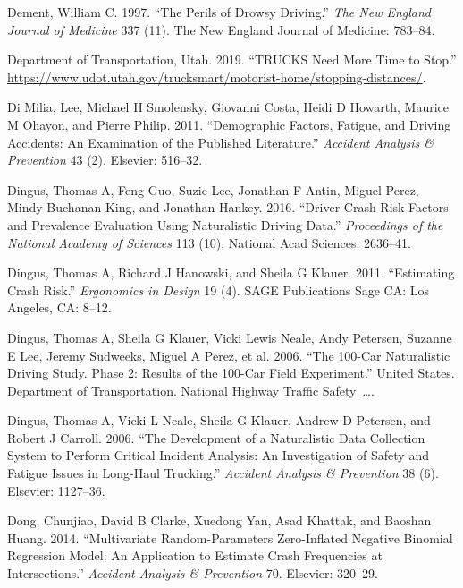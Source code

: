 \documentclass[12pt]{book}
\numberwithin{equation}{chapter}
\begin{document}
\leavevmode\hypertarget{ref-dement1997perils}{}%
Dement, William C. 1997. ``The Perils of Drowsy Driving.'' \emph{The New England Journal of Medicine} 337 (11). The New England Journal of Medicine: 783--84.

\leavevmode\hypertarget{ref-utah2019}{}%
Department of Transportation, Utah. 2019. ``TRUCKS Need More Time to Stop.'' \url{https://www.udot.utah.gov/trucksmart/motorist-home/stopping-distances/}.

\leavevmode\hypertarget{ref-di2011demographic}{}%
Di Milia, Lee, Michael H Smolensky, Giovanni Costa, Heidi D Howarth, Maurice M Ohayon, and Pierre Philip. 2011. ``Demographic Factors, Fatigue, and Driving Accidents: An Examination of the Published Literature.'' \emph{Accident Analysis \& Prevention} 43 (2). Elsevier: 516--32.

\leavevmode\hypertarget{ref-dingus2016driver}{}%
Dingus, Thomas A, Feng Guo, Suzie Lee, Jonathan F Antin, Miguel Perez, Mindy Buchanan-King, and Jonathan Hankey. 2016. ``Driver Crash Risk Factors and Prevalence Evaluation Using Naturalistic Driving Data.'' \emph{Proceedings of the National Academy of Sciences} 113 (10). National Acad Sciences: 2636--41.

\leavevmode\hypertarget{ref-dingus2011estimating}{}%
Dingus, Thomas A, Richard J Hanowski, and Sheila G Klauer. 2011. ``Estimating Crash Risk.'' \emph{Ergonomics in Design} 19 (4). SAGE Publications Sage CA: Los Angeles, CA: 8--12.

\leavevmode\hypertarget{ref-dingus2006100}{}%
Dingus, Thomas A, Sheila G Klauer, Vicki Lewis Neale, Andy Petersen, Suzanne E Lee, Jeremy Sudweeks, Miguel A Perez, et al. 2006. ``The 100-Car Naturalistic Driving Study. Phase 2: Results of the 100-Car Field Experiment.'' United States. Department of Transportation. National Highway Traffic Safety~\ldots{}.

\leavevmode\hypertarget{ref-dingus2006development}{}%
Dingus, Thomas A, Vicki L Neale, Sheila G Klauer, Andrew D Petersen, and Robert J Carroll. 2006. ``The Development of a Naturalistic Data Collection System to Perform Critical Incident Analysis: An Investigation of Safety and Fatigue Issues in Long-Haul Trucking.'' \emph{Accident Analysis \& Prevention} 38 (6). Elsevier: 1127--36.

\leavevmode\hypertarget{ref-dong2014multivariate}{}%
Dong, Chunjiao, David B Clarke, Xuedong Yan, Asad Khattak, and Baoshan Huang. 2014. ``Multivariate Random-Parameters Zero-Inflated Negative Binomial Regression Model: An Application to Estimate Crash Frequencies at Intersections.'' \emph{Accident Analysis \& Prevention} 70. Elsevier: 320--29.
\end{document}
